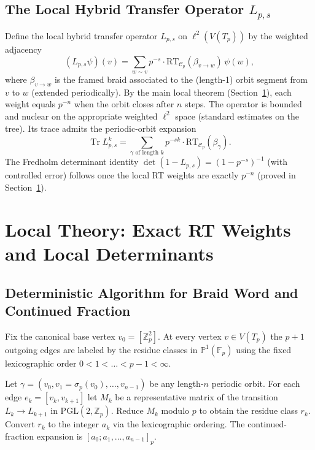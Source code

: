 \documentclass[11pt,a4paper]{amsart}
\begin{document}
\subsection{The Local Hybrid Transfer Operator \(L_{p,s}\)}
\label{subsec:local-operator}

Define the local hybrid transfer operator \(L_{p,s}\) on \(\ell^2(V(T_p))\) by the weighted adjacency
\[
(L_{p,s}\psi)(v)=\sum_{w\sim v}p^{-s}\cdot\mathrm{RT}_{\mathcal{C}_p}(\beta_{v\to w})\,\psi(w),
\]
where \(\beta_{v\to w}\) is the framed braid associated to the (length-1) orbit segment from \(v\) to \(w\) (extended periodically). By the main local theorem (Section~\ref{sec:local-theory}), each weight equals \(p^{-n}\) when the orbit closes after \(n\) steps. The operator is bounded and nuclear on the appropriate weighted \(\ell^2\) space (standard estimates on the tree). Its trace admits the periodic-orbit expansion
\[
\operatorname{Tr} L_{p,s}^k=\sum_{\gamma\text{ of length }k}p^{-sk}\cdot\mathrm{RT}_{\mathcal{C}_p}(\beta_\gamma).
\]
The Fredholm determinant identity \(\det(1-L_{p,s})=(1-p^{-s})^{-1}\) (with controlled error) follows once the local RT weights are exactly \(p^{-n}\) (proved in Section~\ref{sec:local-theory}).

\section{Local Theory: Exact RT Weights and Local Determinants}
\label{sec:local-theory}

\subsection{Deterministic Algorithm for Braid Word and Continued Fraction}
\label{subsec:deterministic-algorithm}

Fix the canonical base vertex \(v_0 = [\mathbb{Z}_p^2]\). At every vertex \(v \in V(T_p)\) the \(p+1\) outgoing edges are labeled by the residue classes in \(\mathbb{P}^1(\mathbb{F}_p)\) using the fixed lexicographic order \(0 < 1 < \dots < p-1 < \infty\).

Let \(\gamma = (v_0, v_1 = \sigma_p(v_0), \dots, v_{n-1})\) be any length-\(n\) periodic orbit. For each edge \(e_k = [v_k, v_{k+1}]\) let \(M_k\) be a representative matrix of the transition \(L_k \to L_{k+1}\) in \(\mathrm{PGL}(2,\mathbb{Z}_p)\). Reduce \(M_k\) modulo \(p\) to obtain the residue class \(r_k\). Convert \(r_k\) to the integer \(a_k\) via the lexicographic ordering. The continued-fraction expansion is \([a_0; a_1, \dots, a_{n-1}]_p\).
\end{document}
